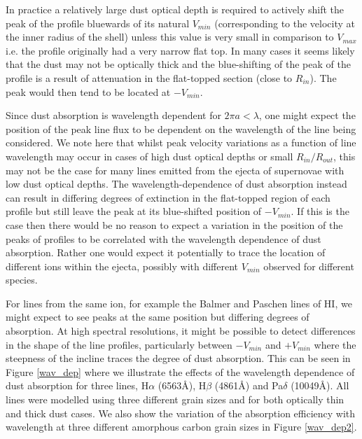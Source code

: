 \documentclass[useAMS,usenatbib,usegraphicx]{mnras}
\begin{document}
In practice a relatively  large dust optical depth is 
required to actively shift the peak of the profile bluewards of its natural 
$V_{min}$  (corresponding to the velocity at the inner radius of the shell) unless this value is very small in comparison to $V_{max}$ i.e. the profile originally had a very narrow flat top.  
In many cases it seems likely that the dust
may not be optically thick and the blue-shifting of the peak of the profile is 
 a result of attenuation in the flat-topped section (close to 
$R_{in}$).  The peak would then tend to be located at $-V_{min}$.

Since dust absorption is wavelength dependent for $2\pi a < \lambda$, one might expect the 
position of the peak line flux to be dependent on the wavelength of the line being 
considered.  We note here that whilst peak velocity variations as a function of line wavelength 
may occur in cases of high dust optical depths or small $R_{in}/R_{out}$, this may 
not be the case for many lines emitted from the ejecta of supernovae with low dust optical depths.  
The wavelength-dependence of dust absorption instead 
can result in differing degrees of extinction in the flat-topped region of 
each profile but still leave the peak at its blue-shifted position of 
$-V_{min}$.  If this is the case then there would be no 
reason to expect a variation in the position of the peaks of profiles to be 
correlated with the wavelength dependence of dust absorption.  Rather one would 
expect it potentially to trace the location of different ions within the ejecta, possibly with different $V_{min}$ observed for  
different species.  

For lines from the same ion, for example the Balmer and Paschen lines of HI,
we might expect to see peaks at the same position but differing degrees of absorption.
At high spectral resolutions, it might be possible to detect differences in the shape of the line 
profiles, particularly between $-V_{min}$ and $+V_{min}$ where the steepness of the 
incline traces the degree of dust absorption.  This can be seen in Figure \ref{wav_dep} 
where we illustrate the effects of the wavelength dependence of dust absorption for 
three lines, H$\alpha$ (6563\AA), H$\beta$ (4861\AA) and Pa$\delta$ (10049\AA).  
All lines were modelled using three different grain sizes and for both optically thin and 
thick dust cases.  We also show the variation of the absorption efficiency with 
wavelength at three different amorphous carbon grain sizes in Figure \ref{wav_dep2}.

\end{document}
